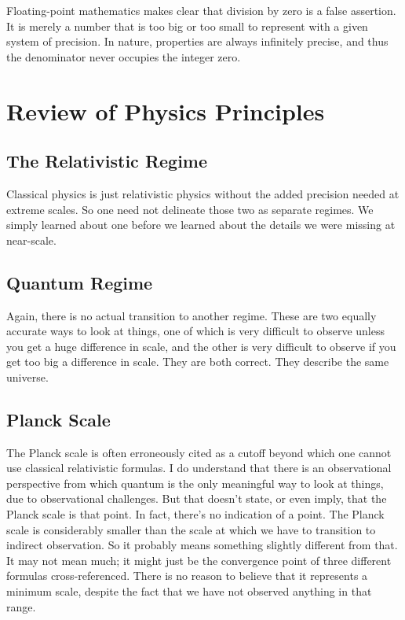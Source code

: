 \documentclass[twoside,twocolumn,9pt]{article}
\begin{document}
Floating-point mathematics makes clear that division by zero is a false assertion. It is merely a number that is too big or too small to represent with a given system of precision. In nature, properties are always infinitely precise, and thus the denominator never occupies the integer zero.

\vspace{1em}
\section{Review of Physics Principles}
\nopagebreak[4]
\subsection{The Relativistic Regime}
Classical physics is just relativistic physics without the added precision needed at extreme scales. So one need not delineate those two as separate regimes. We simply learned about one before we learned about the details we were missing at near-scale.

\subsection{Quantum Regime}
Again, there is no actual transition to another regime. These are two equally accurate ways to look at things, one of which is very difficult to observe unless you get a huge difference in scale, and the other is very difficult to observe if you get too big a difference in scale. They are both correct. They describe the same universe.

\subsection{Planck Scale}
The Planck scale is often erroneously cited as a cutoff beyond which one cannot use classical relativistic formulas. I do understand that there is an observational perspective from which quantum is the only meaningful way to look at things, due to observational challenges. But that doesn't state, or even imply, that the Planck scale is that point. In fact, there's no indication of a point. The Planck scale is considerably smaller than the scale at which we have to transition to indirect observation. So it probably means something slightly different from that. It may not mean much; it might just be the convergence point of three different formulas cross-referenced. There is no reason to believe that it represents a minimum scale, despite the fact that we have not observed anything in that range.

\balance
\clearpage
\end{document}
